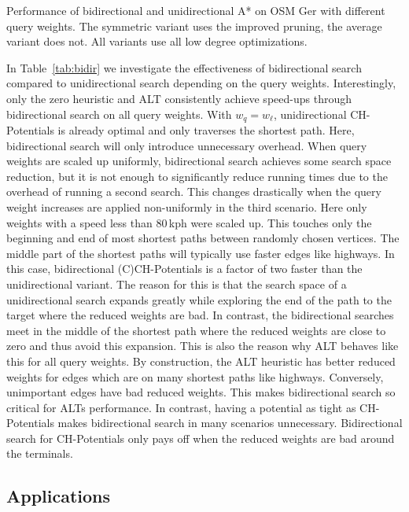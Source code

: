 \documentclass[manuscript,review]{acmart}
\begin{document}
\begin{table}
\centering
\caption{
Performance of bidirectional and unidirectional A* on OSM Ger with different query weights.
The symmetric variant uses the improved pruning, the average variant does not.
All variants use all low degree optimizations.
}\label{tab:bidir}

\end{table}

In Table~\ref{tab:bidir} we investigate the effectiveness of bidirectional search compared to unidirectional search depending on the query weights.
Interestingly, only the zero heuristic and ALT consistently achieve speed-ups through bidirectional search on all query weights.
With $w_q = w_{\ell}$, unidirectional CH-Potentials is already optimal and only traverses the shortest path.
Here, bidirectional search will only introduce unnecessary overhead.
When query weights are scaled up uniformly, bidirectional search achieves some search space reduction, but it is not enough to significantly reduce running times due to the overhead of running a second search.
This changes drastically when the query weight increases are applied non-uniformly in the third scenario.
Here only weights with a speed less than 80\,kph were scaled up.
This touches only the beginning and end of most shortest paths between randomly chosen vertices.
The middle part of the shortest paths will typically use faster edges like highways.
In this case, bidirectional (C)CH-Potentials is a factor of two faster than the unidirectional variant.
The reason for this is that the search space of a unidirectional search expands greatly while exploring the end of the path to the target where the reduced weights are bad.
In contrast, the bidirectional searches meet in the middle of the shortest path where the reduced weights are close to zero and thus avoid this expansion.
This is also the reason why ALT behaves like this for all query weights.
By construction, the ALT heuristic has better reduced weights for edges which are on many shortest paths like highways.
Conversely, unimportant edges have bad reduced weights.
This makes bidirectional search so critical for ALTs performance.
In contrast, having a potential as tight as CH-Potentials makes bidirectional search in many scenarios unnecessary.
Bidirectional search for CH-Potentials only pays off when the reduced weights are bad around the terminals.

\subsection{Applications}
\end{document}
